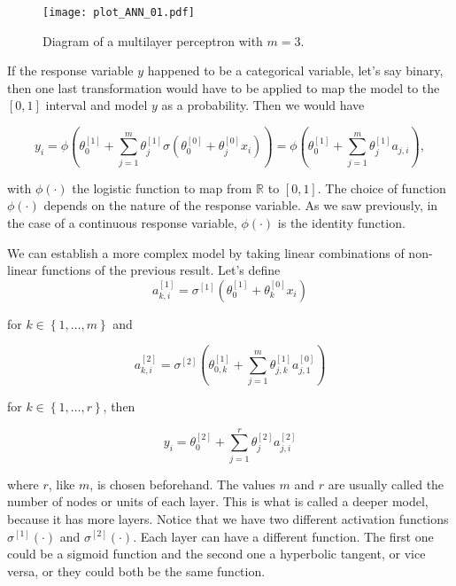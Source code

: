 \begin{figure}[H]
    \centering
    \texttt{[image: plot\_ANN\_01.pdf]}
    \caption{Diagram of a multilayer perceptron with $m = 3$.}
    \label{fig:theory_ANN_diagram_01}
\end{figure}

If the response variable $y$ happened to be a categorical variable, let's say binary, then one last transformation would have to be applied to map the model to the $\left[0, 1\right]$ interval and model $y$ as a probability. Then we would have

$$
  y_i =
  \phi \left( \theta_0^{[1]} +  \sum_{j = 1}^m \theta_j^{[1]} \sigma \left( \theta_0^{[0]} + \theta_j^{[0]} x_i \right) \right) =
  \phi \left( \theta_0^{[1]} +  \sum_{j = 1}^m \theta_j^{[1]} a_{j,i} \right),
$$

with $\phi(\cdot)$ the logistic function to map from $\mathbb{R}$ to $\left[ 0, 1 \right]$. The choice of function $\phi(\cdot)$ depends on the nature of the response variable. As we saw previously, in the case of a continuous response variable, $\phi(\cdot)$ is the identity function.

We can establish a more complex model by taking linear combinations of non-linear functions of the previous result. Let's define
$$
a_{k,i}^{[1]} = \sigma^{[1]} \left( \theta_{0}^{[1]} + \theta_k^{[0]} x_i \right)
$$

for $k \in \left\{ 1, \ldots, m \right\}$ and

$$
  a_{k,i}^{[2]} = \sigma^{[2]} \left(  \theta_{0,k}^{[1]} + \sum_{j = 1}^m \theta_{j,k}^{[1]} a_{j,1}^{[0]}  \right)
$$


for $k \in \left\{ 1, \ldots, r \right\}$, then

$$
  y_i = \theta_0^{[2]} + \sum_{j = 1}^r \theta_j^{[2]} a_{j,i}^{[2]}
$$

where $r$, like $m$, is chosen beforehand. The values $m$ and $r$ are usually called the number of nodes or units of each layer. This is what is called a deeper model, because it has more layers. Notice that we have two different activation functions $\sigma^{[1]}(\cdot)$ and $\sigma^{[2]}(\cdot)$. Each layer can have a different function. The first one could be a sigmoid function and the second one a hyperbolic tangent, or vice versa, or they could both be the same function.

